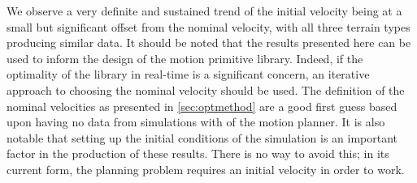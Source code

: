 We observe a very definite and sustained trend of the initial velocity being at a small but significant offset from the nominal velocity, with all three terrain types producing similar data. It should be noted that the results presented here can be used to inform the design of the motion primitive library. Indeed, if the optimality of the library in real-time is a significant concern, an iterative approach to choosing the nominal velocity should be used. The definition of the nominal velocities as presented in \ref{sec:optmethod} are a good first guess based upon having no data from simulations with of the motion planner. It is also notable that setting up the initial conditions of the simulation is an important factor in the production of these results. There is no way to avoid this; in its current form, the planning problem requires an initial velocity in order to work.